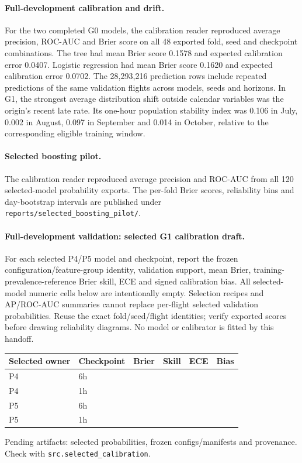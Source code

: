 \documentclass{article}
\begin{document}
\paragraph{Full-development calibration and drift.} For the two completed G0 models, the calibration reader reproduced average precision, ROC-AUC and Brier score on all 48 exported fold, seed and checkpoint combinations. The tree had mean Brier score 0.1578 and expected calibration error 0.0407. Logistic regression had mean Brier score 0.1620 and expected calibration error 0.0702. The 28,293,216 prediction rows include repeated predictions of the same validation flights across models, seeds and horizons. In G1, the strongest average distribution shift outside calendar variables was the origin's recent late rate. Its one-hour population stability index was 0.106 in July, 0.002 in August, 0.097 in September and 0.014 in October, relative to the corresponding eligible training window.
\paragraph{Selected boosting pilot.} The calibration reader reproduced average precision and ROC-AUC from all 120 selected-model probability exports. The per-fold Brier scores, reliability bins and day-bootstrap intervals are published under \texttt{reports/selected\_boosting\_pilot/}.

\paragraph{Full-development validation: selected G1 calibration draft.}
For each selected P4/P5 model and checkpoint, report the frozen configuration/feature-group identity,
validation support, mean Brier, training-prevalence-reference Brier skill, ECE and signed calibration bias.
All selected-model numeric cells below are intentionally empty. Selection recipes and AP/ROC-AUC summaries
cannot replace per-flight selected validation probabilities. Reuse the exact fold/seed/flight identities;
verify exported scores before drawing reliability diagrams. No model or calibrator is fitted by this handoff.
\begin{center}\small
\begin{tabular}{llrrrr}\toprule
Selected owner & Checkpoint & Brier & Skill & ECE & Bias \\\midrule
P4 & 6h & & & & \\
P4 & 1h & & & & \\
P5 & 6h & & & & \\
P5 & 1h & & & & \\
\bottomrule\end{tabular}\end{center}
\noindent Pending artifacts: selected probabilities, frozen configs/manifests and provenance.\\
Check with \texttt{src.selected\_calibration}.
\end{document}
